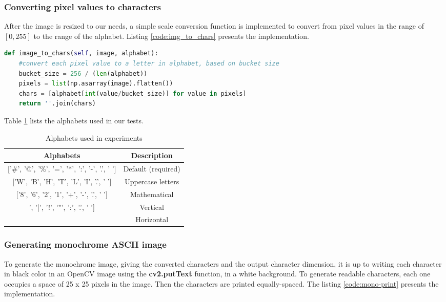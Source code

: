 \documentclass[]{IEEEtran}
\begin{document}
\subsubsection{Converting pixel values to characters}
After the image is resized to our needs, a simple scale conversion function is implemented to convert from pixel values in the range of $[0, 255]$ to the range of the alphabet. Listing \ref{code:img_to_chars} presents the implementation.
 \begin{lstlisting}[language=Python, caption={Pixel to character scale converter}, label={code:img_to_chars}]
def image_to_chars(self, image, alphabet):
    #convert each pixel value to a letter in alphabet, based on bucket size
    bucket_size = 256 / (len(alphabet))
    pixels = list(np.asarray(image).flatten())
    chars = [alphabet[int(value/bucket_size)] for value in pixels]
    return ''.join(chars)
\end{lstlisting}
Table \ref{table:alphabet} lists the alphabets used in our tests.

\begin{table}[h!]
\centering
\begin{center}
\begin{tabular}{ |c|c| } 
 \hline
 Alphabets & Description \\
 \hline
 {[}'\#', '@', '\%', '=', '*', ':', '-', '.', ' '{]} & Default (required) \\ 
 \hline
 {[}'W', 'B', 'H', 'T', 'L', 'I', '.', ' '{]}  & Uppercase letters  \\
 \hline
 {[}'8', '6', '2', '1', '+', '-', '.', ' '{]} & Mathematical  \\ 
 \hline
 ['\}', ']', '|', '!', '"', ':', '.', ' '] & Vertical \\
 \hline
 ['\#', '=', '"', '\~','-', '\_', '.', ' '] & Horizontal \\
 \hline
\end{tabular}
 \label{table:alphabet}
 \caption{Alphabets used in experiments}
\end{center}
\end{table}

\subsubsection{Generating monochrome ASCII image}
To generate the monochrome image, giving the converted characters and the output character dimension, it is up to writing each character in black color in an OpenCV image using the \textbf{cv2.putText} function, in a white background. To generate readable characters, each one occupies a space of 25 x 25 pixels in the image. Then the characters are printed equally-spaced. The listing \ref{code:mono-print} presents the implementation.
\end{document}
